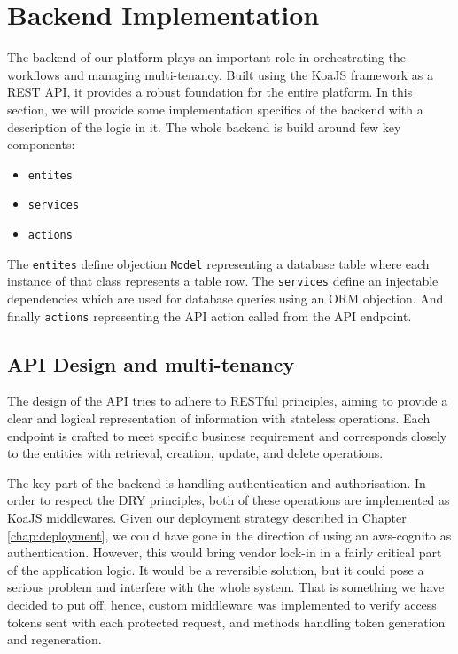 \section{Backend Implementation}
\label{sec:backend-implementation}
The backend of our platform plays an important role in orchestrating the workflows and managing multi-tenancy.
Built using the KoaJS framework as a REST API, it provides a robust foundation for the entire platform.
In this section, we will provide some implementation specifics of the backend with a description of the logic in it.
The whole backend is build around few key components:
\begin{itemize}
    \item \texttt{entites}
    \item \texttt{services}
    \item \texttt{actions}
\end{itemize}

The \texttt{entites} define \gls{objection} \texttt{Model} representing a database table where each instance of that class represents a table row.
The \texttt{services} define an injectable dependencies which are used for database queries using an \ac{ORM} \gls{objection}.
And finally \texttt{actions} representing the API action called from the API endpoint.

\subsection{API Design and multi-tenancy}
\label{subsec:api-design-endpoints}

The design of the API tries to adhere to RESTful principles, aiming to provide a clear and logical representation of information with stateless operations.
Each endpoint is crafted to meet specific business requirement and corresponds closely to the entities with retrieval, creation, update, and delete operations.

The key part of the backend is handling authentication and authorisation. 
In order to respect the \ac{DRY} principles, both of these operations are implemented as KoaJS middlewares.
Given our deployment strategy described in Chapter \ref{chap:deployment}, we could have gone in the direction of using an \gls{aws-cognito} as authentication.
However, this would bring vendor lock-in in a fairly critical part of the application logic.
It would be a reversible solution, but it could pose a serious problem and interfere with the whole system.
That is something we have decided to put off; hence, custom middleware was implemented to verify access tokens sent with each protected request, and methods handling token generation and regeneration.

